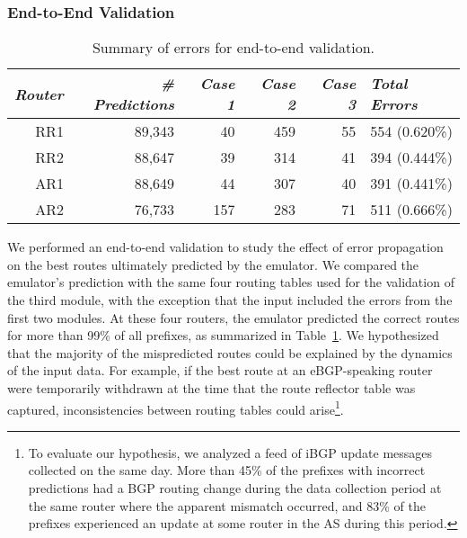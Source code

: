\subsubsection{End-to-End Validation}
\begin{table}
\begin{center}

{\small
\begin{tabular}{r|r|rrr|l}
{\em Router} & {\em \# Predictions}
& {\em Case 1} & {\em Case 2}
& {\em Case 3} & {\em Total Errors} \\ \hline 

RR1 &   89,343&  40&  459& 55 &  554 (0.620\%)   \\ %
RR2 &   88,647&  39&  314& 41 &  394 (0.444\%)   \\ %
AR1 &   88,649&  44&  307& 40 &  391 (0.441\%)    \\%
AR2 &   76,733& 157&  283& 71 &  511 (0.666\%)   \\ %
\end{tabular}
\vspace{-0.15in}
}
\end{center}
\caption{Summary of errors for end-to-end validation.} 
\label{tab:e2e_summary}
\end{table}

We performed an end-to-end validation to study the effect of error
propagation on the best routes ultimately predicted by the emulator.
We compared the emulator's prediction with the same four routing
tables used for the validation of the third module, with the exception
that the input included the errors from the first two modules.  At
these four routers, the emulator predicted the correct routes for more
than 99\% of all prefixes, as summarized in Table~\ref{tab:e2e_summary}.
%
We hypothesized that the majority of the mispredicted routes could be
explained by the dynamics of the input data.  
For example, if the best route at an eBGP-speaking router were
temporarily withdrawn at the time that the route reflector table was
captured, inconsistencies between routing tables could
arise\footnote{To evaluate our hypothesis, we analyzed a feed of iBGP
update messages collected on the same day.  More than 45\% of the
prefixes with incorrect predictions had a BGP routing change during
the data collection period at the same router where the apparent
mismatch occurred, and 83\% of the prefixes experienced an update at
some router in the AS during this period.}.

